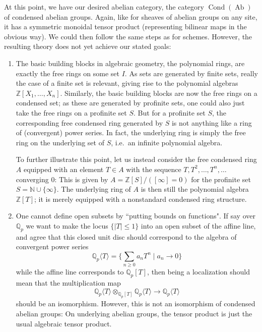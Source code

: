 \documentclass[11pt]{amsbook}
\DeclareMathOperator{\Cond}{Cond}
\DeclareMathOperator{\Ab}{Ab}
\numberwithin{equation}{section}
\numberwithin{theorem}{section}
\theoremstyle{definition}
\begin{document}
At this point, we have our desired abelian category, the category $\Cond(\Ab)$ of condensed abelian groups. Again, like for sheaves of abelian groups on any site, it has a symmetric monoidal tensor product (representing bilinear maps in the obvious way). We could then follow the same steps as for schemes. However, the resulting theory does not yet achieve our stated goals:

\begin{enumerate}
\item The basic building blocks in algebraic geometry, the polynomial rings, are exactly the free rings on some set $I$. As sets are generated by finite sets, really the case of a finite set is relevant, giving rise to the polynomial algebras $\mathbb Z[X_1,\ldots,X_n]$. Similarly, the basic building blocks are now the free rings on a condensed set; as these are generated by profinite sets, one could also just take the free rings on a profinite set $S$. But for a profinite set $S$, the corresponding free condensed ring generated by $S$ is not anything like a ring of (convergent) power series. In fact, the underlying ring is simply the free ring on the underlying set of $S$, i.e.~an infinite polynomial algebra.

To further illustrate this point, let us instead consider the free condensed ring $A$ equipped with an element $T\in A$ with the sequence $T,T^2,\ldots,T^n,\ldots$ converging $0$: This is given by $A=\mathbb Z[S]/([\infty]=0)$ for the profinite set $S=\mathbb N\cup \{\infty\}$. The underlying ring of $A$ is then still the polynomial algebra $\mathbb Z[T]$; it is merely equipped with a nonstandard condensed ring structure.
\item One cannot define open subsets by ``putting bounds on functions". If say over $\mathbb Q_p$ we want to make the locus $\{|T|\leq 1\}$ into an open subset of the affine line, and agree that this closed unit disc should correspond to the algebra of convergent power series
\[
\mathbb Q_p\langle T\rangle = \{\sum_{n\geq 0} a_n T^n\mid a_n\to 0\}
\]
while the affine line corresponds to $\mathbb Q_p[T]$, then being a localization should mean that the multiplication map
\[
\mathbb Q_p\langle T\rangle\otimes_{\mathbb Q_p[T]} \mathbb Q_p\langle T\rangle\to \mathbb Q_p\langle T\rangle
\]
should be an isomorphism. However, this is not an isomorphism of condensed abelian groups: On underlying abelian groups, the tensor product is just the usual algebraic tensor product.
\end{enumerate}
\end{document}

